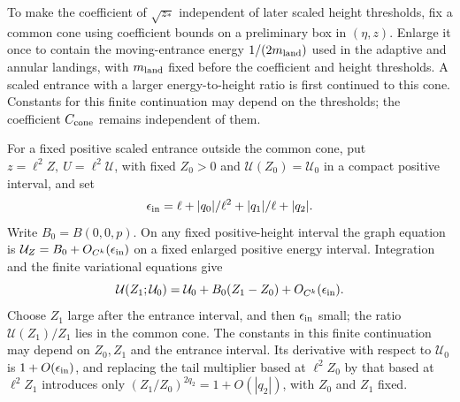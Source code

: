 To make the coefficient of \(\sqrt{z_*}\) independent of later scaled
height thresholds, fix a common cone using coefficient bounds on a
preliminary box in \((\eta,z)\). Enlarge it once to contain the
moving-entrance energy \(1/(2m_{\rm land})\) used in the adaptive and
annular landings, with \(m_{\rm land}\) fixed before the coefficient
and height thresholds. A scaled entrance with a larger energy-to-height
ratio is first continued to this cone. Constants for this finite
continuation may depend on the thresholds; the coefficient
\(C_{\rm cone}\) remains independent of them.

For a fixed positive scaled entrance outside the common cone, put
\(z=\ell^2Z,\ U=\ell^2\mathcal U\),
with fixed \(Z_0>0\) and \(\mathcal U(Z_0)=\mathcal U_0\) in a compact positive
interval, and set
\[
 \epsilon_{\rm in}=\ell+|q_0|/\ell^2+|q_1|/\ell+|q_2|.
\]
Write \(B_0=B(0,0,p)\). On any fixed positive-height interval the graph
equation is
\(\mathcal U_Z=B_0+O_{C^k}(\epsilon_{\rm in})\) on a fixed enlarged
positive energy interval. Integration and the finite variational
equations give
\begin{equation}
\label{eq:direct-finite-common-cone-entry}
 \mathcal U(Z_1;\mathcal U_0)=\mathcal U_0+B_0(Z_1-Z_0)
                +O_{C^k}(\epsilon_{\rm in}).
\end{equation}
Choose \(Z_1\) large after the entrance interval, and then
\(\epsilon_{\rm in}\) small; the ratio \(\mathcal U(Z_1)/Z_1\) lies
in the common cone. The constants in this finite continuation may
depend on \(Z_0,Z_1\) and the entrance interval. Its derivative with
respect to \(\mathcal U_0\) is \(1+O(\epsilon_{\rm in})\), and replacing the tail multiplier
based at \(\ell^2Z_0\) by that based at \(\ell^2Z_1\) introduces
only \((Z_1/Z_0)^{2q_2}=1+O(|q_2|)\), with \(Z_0\) and \(Z_1\) fixed.

